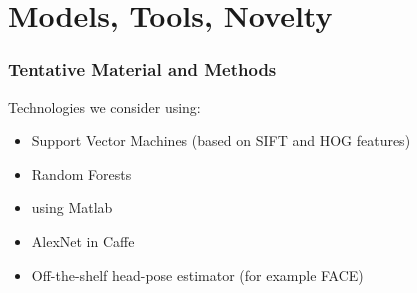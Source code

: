 \documentclass{beamer}
\begin{document}
\begin{frame}
\begin{columns}
\begin{column}{0.25\textwidth}
\begin{center}
				\end{center}
			\end{column}
		\end{columns}
		
	\end{frame}
	
	
	\section{Models, Tools, Novelty}	

    \begin{frame}
        \frametitle{Tentative Material and Methods}
        Technologies we consider using:
        \begin{itemize}
            \item Support Vector Machines (based on SIFT and HOG features)
            \item Random Forests
            \item using Matlab
            \item AlexNet in Caffe
            \item Off-the-shelf head-pose estimator (for example FACE)
        \end{itemize}

    \end{frame}
\end{document}
